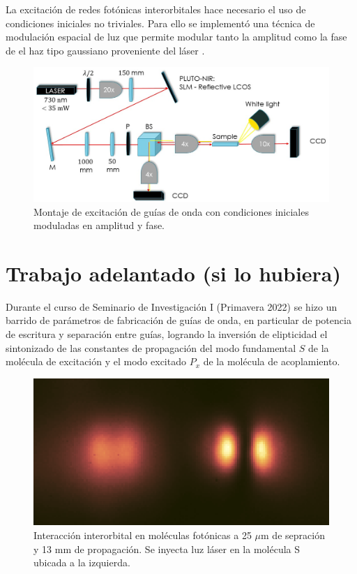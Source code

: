 \documentclass{article}
\begin{document}
La excitación de redes fotónicas interorbitales hace necesario el uso de condiciones iniciales no triviales. Para ello se implementó una técnica de modulación espacial de luz que permite modular tanto la amplitud como la fase de el haz tipo gaussiano proveniente del láser \cite{slm}.

\begin{figure}[H]
	\centering
	\includegraphics[width=0.9\linewidth]{./media/SLMsetup.png}
	\caption{Montaje de excitación de guías de onda con condiciones iniciales moduladas en amplitud y fase.\label{fig:femtosetup}}
\end{figure}

\section{Trabajo adelantado (si lo hubiera)}

Durante el curso de Seminario de Investigación I (Primavera 2022) se hizo un barrido de parámetros de fabricación de guías de onda, en particular de potencia de escritura y separación entre guías, logrando la inversión de elipticidad el sintonizado de las constantes de propagación del modo fundamental $S$ de la molécula de excitación y el modo excitado $P_x$ de la molécula de acoplamiento.


\begin{figure}[H]
	\centering
	\includegraphics[width=0.5\linewidth]{./media/SPinteraction.png}
	\caption{Interacción interorbital en moléculas fotónicas a 25 $\mu$m de sepración y 13 mm de propagación. Se inyecta luz láser en la molécula S ubicada a la izquierda.}
\end{figure}
\end{document}
